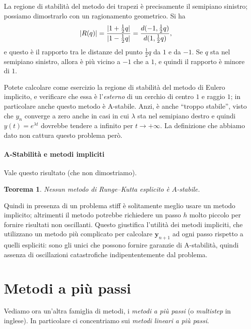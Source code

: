 \documentclass[a4paper]{report}
\DeclarePairedDelimiter{\abs}{\lvert}{\rvert}
\newtheorem{theorem}{Teorema}[chapter]
\theoremstyle{definiton}
\theoremstyle{remark}
\newcommand{\y}{\mathbf{y}}
\begin{document}
La regione di stabilità del metodo dei trapezi è precisamente il semipiano sinistro; possiamo dimostrarlo con un ragionamento geometrico. Si ha
\[
\abs{R(q)} = \frac{\abs{1+\frac12q}}{\abs{1-\frac12q}} = \frac{d(-1,\frac12q)}{d(1,\frac12q)},
\]
e questo è il rapporto tra le distanze del punto $\frac12q$ da $1$ e da $-1$. Se $q$ sta nel semipiano sinistro, allora è più vicino a $-1$ che a $1$, e quindi il rapporto è minore di $1$.

Potete calcolare come esercizio la regione di stabilità del metodo di Eulero implicito, e verificare che essa è l'\emph{esterno} di un cerchio di centro $1$ e raggio $1$; in particolare anche questo metodo è A-stabile. Anzi, è anche ``troppo stabile'', visto che $y_n$ converge a zero anche in casi in cui $\lambda$ sta nel semipiano destro e quindi $y(t) = e^
{\lambda t}$ dovrebbe tendere a infinito per $t\to+\infty$. La definizione che abbiamo dato non cattura questo problema però.

\paragraph{A-Stabilità e metodi impliciti} Vale questo risultato (che non dimostriamo).
\begin{theorem}
Nessun metodo di Runge--Kutta esplicito è $A$-stabile.
\end{theorem}
Quindi in presenza di un problema stiff è solitamente meglio usare un metodo implicito; altrimenti il metodo potrebbe richiedere un passo $h$ molto piccolo per fornire risultati non oscillanti. Questo giustifica l'utilità dei metodi impliciti, che utilizzano un metodo più complicato per calcolare $\y_{n+1}$ ad ogni passo rispetto a quelli espliciti: sono gli unici che possono fornire garanzie di A-stabilità, quindi assenza di oscillazioni catastrofiche indipententemente dal problema.

\section{Metodi a più passi}

Vediamo ora un'altra famiglia di metodi, i \emph{metodi a più passi} (o \emph{multistep} in inglese). In particolare ci concentriamo sui \emph{metodi lineari a più passi}.
\end{document}
